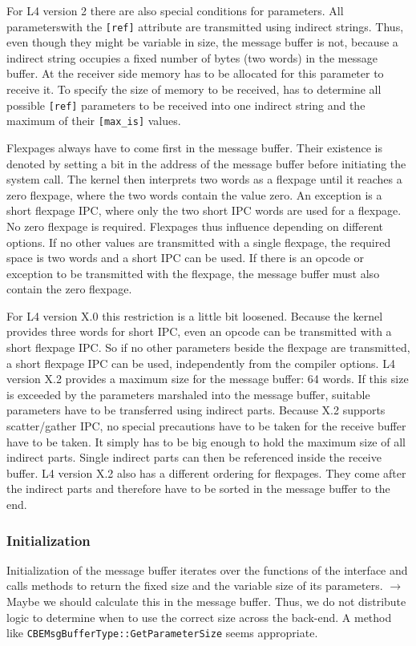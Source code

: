 For L4 version 2 there are also special conditions for parameters.  All
parameterswith the \verb|[ref]| attribute are transmitted using indirect
strings.  Thus, even though they might be variable in size, the message buffer
is not, because a indirect string occupies a fixed number of bytes (two words)
in the message buffer.  At the receiver side memory has to be allocated for
this parameter to receive it.  To specify the size of memory to be received,
\dice{} has to determine all possible \verb|[ref]| parameters to be received
into one indirect string and the maximum of their \verb|[max_is]| values.

Flexpages always have to come first in the message buffer.  Their existence is
denoted by setting a bit in the address of the message buffer before
initiating the system call.  The kernel then interprets two words as a
flexpage until it reaches a zero flexpage, where the two words contain the
value zero.  An exception is a short flexpage IPC, where only the two short
IPC words are used for a flexpage.  No zero flexpage is required.  Flexpages
thus influence depending on different options.  If no other values are
transmitted with a single flexpage, the required space is two words and a
short IPC can be used. If there is an opcode or exception to be transmitted
with the flexpage, the message buffer must also contain the zero flexpage.

For L4 version X.0 this restriction is a little bit loosened.  Because the
kernel provides three words for short IPC, even an opcode can be transmitted
with a short flexpage IPC.  So if no other parameters beside the flexpage are
transmitted, a short flexpage IPC can be used, independently from the compiler
options. L4 version X.2 provides a maximum size for the message buffer: 64
words.  If this size is exceeded by the  parameters marshaled into the message
buffer, suitable parameters have to be transferred using indirect parts.
Because X.2 supports scatter/gather IPC, no special precautions have to be
taken for the receive buffer have to be taken.  It simply has to be big enough
to hold the maximum size of all indirect parts.  Single indirect parts can
then be referenced inside the receive buffer. L4 version X.2 also has a
different ordering for flexpages.  They come after the indirect parts and
therefore have to be sorted in the message buffer to the end.

\subsubsection{Initialization}
Initialization of the message buffer iterates over the functions of the
interface and calls methods to return the fixed size and the variable size of
its parameters.  $\rightarrow$ Maybe we should calculate this in the message
buffer. Thus, we do not distribute logic to determine when to use the correct
size across the back-end.  A method like
\verb|CBEMsgBufferType::GetParameterSize| seems appropriate.

